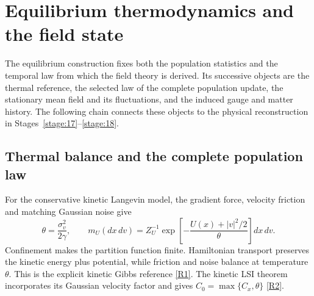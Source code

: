 \documentclass[11pt,a4paper]{article}
\begin{document}
\begin{landscape}
\begin{center}
\end{center}
\end{landscape}
\clearpage

\section*{Equilibrium thermodynamics and the field state}
\label{sec:equilibrium-thermodynamics}
The equilibrium construction fixes both the population statistics and the temporal law from which the field theory is derived. Its successive objects are the thermal reference, the selected law of the complete population update, the stationary mean field and its fluctuations, and the induced gauge and matter history. The following chain connects these objects to the physical reconstruction in Stages~\ref{stage:17}--\ref{stage:18}.

\subsection*{Thermal balance and the complete population law}
For the conservative kinetic Langevin model, the gradient force, velocity friction and matching Gaussian noise give
\[
\theta=\frac{\sigma_v^2}{2\gamma},\qquad
m_U(dx\,dv)=Z_U^{-1}
\exp\!\left[-\frac{U(x)+|v|^2/2}{\theta}\right]dx\,dv.
\]
Confinement makes the partition function finite. Hamiltonian transport preserves the kinetic energy plus potential, while friction and noise balance at temperature \(\theta\). This is the explicit kinetic Gibbs reference \hyperref[src:def-gibbs-kinetic]{[R1]}. The kinetic LSI theorem incorporates its Gaussian velocity factor and gives \(C_0=\max\{C_x,\theta\}\) \hyperref[src:thm-kinetic-lsi]{[R2]}.
\end{document}
